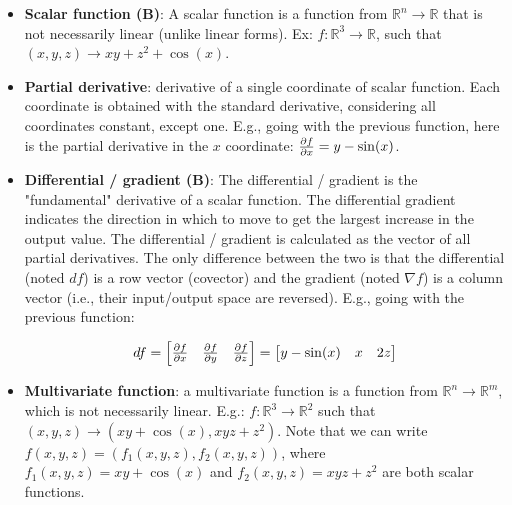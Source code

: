 \documentclass{article}
\begin{document}
\begin{itemize}
    \item \textbf{Scalar function (B)}: A scalar function is a function from $\mathbb{R}^n \rightarrow \mathbb{R}$ that is not necessarily linear (unlike linear forms). Ex: $f : \mathbb{R}^3 \rightarrow \mathbb{R}$, such that $(x, y, z) \rightarrow xy + z^2 + \cos(x)$.
    
    \item \textbf{Partial derivative}: derivative of a single coordinate of scalar function. Each coordinate is obtained with the standard derivative, considering all coordinates constant, except one. E.g., going with the previous function, here is the partial derivative in the $x$ coordinate: $\pdv{f}{x} = y - \sin(x)$.
    
    \item \textbf{Differential / gradient (B)}: The differential / gradient is the "fundamental" derivative of a scalar function. The differential gradient indicates the direction in which to move to get the largest increase in the output value. The differential / gradient is calculated as the vector of all partial derivatives. The only difference between the two is that the differential (noted $df$) is a row vector (covector) and the gradient (noted $\nabla f$) is a column vector (i.e., their input/output space are reversed). E.g., going with the previous function:
    
    \begin{align*}
		df
		=
		\begin{bmatrix}
			\pdv{f}{x} & \pdv{f}{y} & \pdv{f}{z}
		\end{bmatrix}
		=
		\begin{bmatrix}
			y - \sin(x) & x & 2z
		\end{bmatrix}
    \end{align*}
    
    \item \textbf{Multivariate function}: a multivariate function is a function from $\mathbb{R}^n \rightarrow \mathbb{R}^m$, which is not necessarily linear. E.g.: $f : \mathbb{R}^3 \rightarrow \mathbb{R}^2$ such that $(x,y,z) \rightarrow (xy + \cos(x), xyz + z^2)$. Note that we can write $f(x,y,z) = (f_1(x,y,z), f_2(x,y,z))$, where $f_1(x,y,z) = xy + \cos(x)$ and $f_2(x,y,z) = xyz + z^2$ are both scalar functions.
    

\end{itemize}
\end{document}
